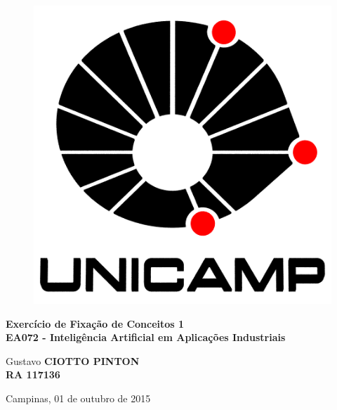 \begin{titlepage}
\vspace*{.28\textheight}
\begin{center}
%
\begin{figure}[h]
    \centering
    \includegraphics[scale=0.20]{image/LogoUnicamp}
\end{figure} 
%
\vspace*{10pt}
\textbf{\LARGE Exercício de Fixação de Conceitos 1} \\ \vspace{12pt}
\textbf{\large EA072 - Inteligência Artificial em Aplicações Industriais}
\vspace*{72pt}

Gustavo \textbf{CIOTTO PINTON} \\ 
\textbf{ RA 117136}
 

Campinas, 01 de outubro de 2015

\end{center}
\end{titlepage}

\newpage